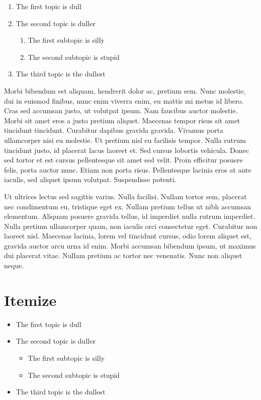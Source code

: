 \begin{enumerate}
\item The first topic is dull
\item The second topic is duller
\begin{enumerate}
\item The first subtopic is silly
\item The second subtopic is stupid
\end{enumerate}
\item The third topic is the dullest
\end{enumerate}
Morbi bibendum est aliquam, hendrerit dolor ac, pretium sem. Nunc molestie, dui in euismod finibus, nunc enim viverra enim, eu mattis mi metus id libero. Cras sed accumsan justo, ut volutpat ipsum. Nam faucibus auctor molestie. Morbi sit amet eros a justo pretium aliquet. Maecenas tempor risus sit amet tincidunt tincidunt. Curabitur dapibus gravida gravida. Vivamus porta ullamcorper nisi eu molestie. Ut pretium nisl eu facilisis tempor. Nulla rutrum tincidunt justo, id placerat lacus laoreet et. Sed cursus lobortis vehicula. Donec sed tortor et est cursus pellentesque sit amet sed velit. Proin efficitur posuere felis, porta auctor nunc. Etiam non porta risus. Pellentesque lacinia eros at ante iaculis, sed aliquet ipsum volutpat. Suspendisse potenti.

Ut ultrices lectus sed sagittis varius. Nulla facilisi. Nullam tortor sem, placerat nec condimentum eu, tristique eget ex. Nullam pretium tellus ut nibh accumsan elementum. Aliquam posuere gravida tellus, id imperdiet nulla rutrum imperdiet. Nulla pretium ullamcorper quam, non iaculis orci consectetur eget. Curabitur non laoreet nisl. Maecenas lacinia, lorem vel tincidunt cursus, odio lorem aliquet est, gravida auctor arcu urna id enim. Morbi accumsan bibendum ipsum, ut maximus dui placerat vitae. Nullam pretium ac tortor nec venenatis. Nunc non aliquet neque. 

\section*{Itemize}
\begin{itemize}
\item The first topic is dull
\item The second topic is duller
\begin{itemize}
\item The first subtopic is silly
\item The second subtopic is stupid
\end{itemize}
\item The third topic is the dullest
\end{itemize}

